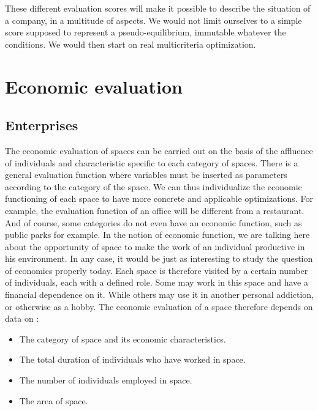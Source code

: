 These different evaluation scores will make it possible to describe the situation of a company, in a multitude of aspects. We would not limit ourselves to a simple score supposed to represent a pseudo-equilibrium, immutable whatever the conditions. We would then start on real multicriteria optimization.\\

\newpage

\section{Economic evaluation}

\subsection{Enterprises}

The economic evaluation of spaces can be carried out on the basis of the affluence of individuals and characteristic specific to each category of spaces. There is a general evaluation function where variables must be inserted as parameters according to the category of the space. We can thus individualize the economic functioning of each space to have more concrete and applicable optimizations. For example, the evaluation function of an office will be different from a restaurant. And of course, some categories do not even have an economic function, such as public parks for example. In the notion of economic function, we are talking here about the opportunity of space to make the work of an individual productive in his environment. In any case, it would be just as interesting to study the question of economics properly today. Each space is therefore visited by a certain number of individuals, each with a defined role. Some may work in this space and have a financial dependence on it. While others may use it in another personal addiction, or otherwise as a hobby. The economic evaluation of a space therefore depends on data on :\\

\begin{itemize}
\item The category of space and its economic characteristics.
\item The total duration of individuals who have worked in space.
\item The number of individuals employed in space.
\item The area of space.\\
\end{itemize}


